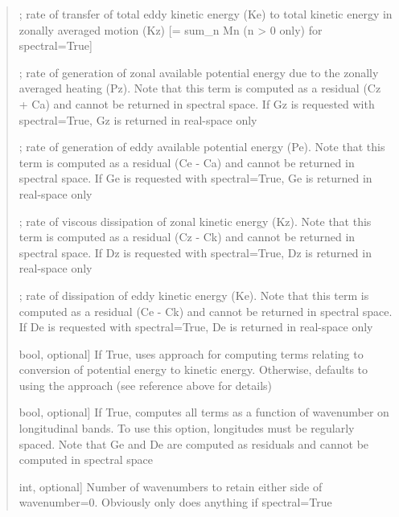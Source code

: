 \documentclass[letterpaper,10pt,english]{sphinxmanual}
\begin{document}
\begin{fulllineitems}
\begin{quote}
\begin{description}
\begin{description}
\begin{DUlineblock}{0em}
\item[] ; rate of transfer of total eddy kinetic energy (Ke) to total kinetic energy in zonally                     averaged motion (Kz) {[}= sum\_n Mn (n \textgreater{} 0 only) for spectral=True{]}
\item[] ; rate of generation of zonal available potential energy due to the zonally averaged heating (Pz).                     Note that this term is computed as a residual (Cz + Ca) and cannot be returned in spectral space.                     If Gz is requested with spectral=True, Gz is returned in real-space only
\item[] ; rate of generation of eddy available potential energy (Pe). Note that this term is computed as                     a residual (Ce - Ca) and cannot be returned in spectral space. If Ge is requested with spectral=True,                     Ge is returned in real-space only
\item[] ; rate of viscous dissipation of zonal kinetic energy (Kz). Note that this term is computed as a                     residual (Cz - Ck) and cannot be returned in spectral space. If Dz is requested with spectral=True, Dz                     is returned in real-space only
\item[] ; rate of dissipation of eddy kinetic energy (Ke). Note that this term is computed as a residual                     (Ce - Ck) and cannot be returned in spectral space. If De is requested with spectral=True, De is                     returned in real-space only
\end{DUlineblock}

\item[{\sphinxstylestrong{vgradz}}] \leavevmode{[}bool, optional{]}
If True, uses  approach for computing terms relating to conversion of potential energy to                     kinetic energy. Otherwise, defaults to using the  approach (see reference above for details)

\item[{\sphinxstylestrong{spectral}}] \leavevmode{[}bool, optional{]}
If True, computes all terms as a function of wavenumber on longitudinal bands. To use this                     option, longitudes must be regularly spaced. Note that Ge and De are computed as residuals and                     cannot be computed in spectral space

\item[{\sphinxstylestrong{n\_wavenumbers}}] \leavevmode{[}int, optional{]}
Number of wavenumbers to retain either side of wavenumber=0. Obviously only does anything if                     spectral=True


\end{description}
\end{description}
\end{quote}
\end{fulllineitems}
\end{document}
